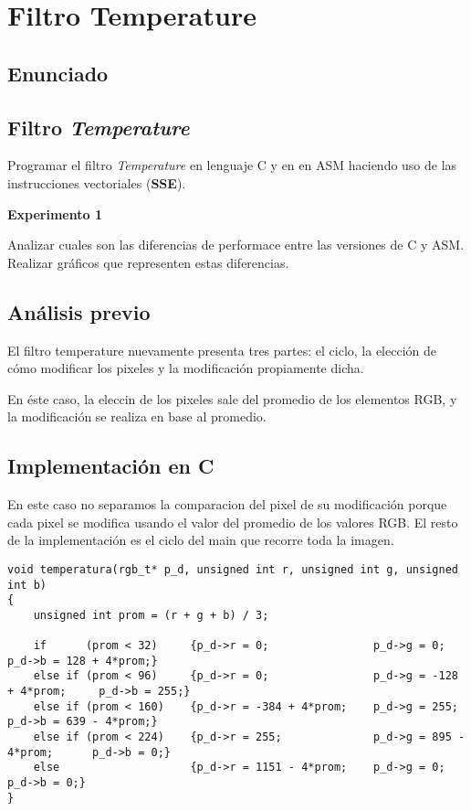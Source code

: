 \section{Filtro Temperature}
\subsection{Enunciado}

\subsection*{Filtro \textit{Temperature}}

  Programar el filtro \textit{Temperature} en lenguaje C y en en ASM haciendo uso de 
  las instrucciones vectoriales (\textbf{SSE}).


\vspace*{0.3cm} \noindent
\textbf{Experimento 1}

  Analizar cuales son las diferencias de performace entre las versiones de C y ASM. 
  Realizar gráficos que representen estas diferencias.
  
\subsection{An\'alisis previo}

El filtro temperature nuevamente presenta tres partes: el ciclo, la elecci\'on de c\'omo modificar los pixeles y la modificaci\'on propiamente dicha.

En \'este caso, la eleccin de los pixeles sale del promedio de los elementos RGB, y la modificaci\'on se realiza en base al promedio.

\subsection{Implementaci\'on en C}

En este caso no separamos la comparacion del pixel de su modificaci\'on porque cada pixel se modifica usando el valor del promedio de los valores RGB. El resto de la implementaci\'on es el ciclo del main que recorre toda la imagen.

\begin{codesnippet}
\begin{verbatim}
void temperatura(rgb_t* p_d, unsigned int r, unsigned int g, unsigned int b)
{
    unsigned int prom = (r + g + b) / 3;

    if 		(prom < 32)		{p_d->r = 0; 				p_d->g = 0; 				p_d->b = 128 + 4*prom;}
    else if (prom < 96)		{p_d->r = 0; 				p_d->g = -128 + 4*prom; 	p_d->b = 255;}
    else if (prom < 160)	{p_d->r = -384 + 4*prom;	p_d->g = 255; 				p_d->b = 639 - 4*prom;}
    else if (prom < 224)	{p_d->r = 255; 				p_d->g = 895 - 4*prom;	 	p_d->b = 0;}
    else 					{p_d->r = 1151 - 4*prom;	p_d->g = 0; 				p_d->b = 0;}
}
\end{verbatim}
\end{codesnippet}

